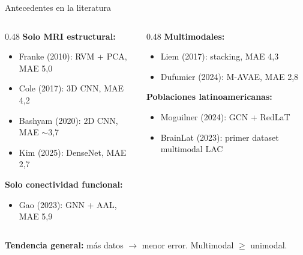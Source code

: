 \documentclass[aspectratio=169, 11pt]{beamer}
\begin{document}
\begin{frame}{Antecedentes en la literatura}
  \begin{columns}[T]
    \begin{column}{0.48\textwidth}
      \textbf{Solo MRI estructural:}
      \begin{itemize}
        \item Franke (2010): RVM + PCA, MAE 5,0
        \item Cole (2017): 3D CNN, MAE 4,2
        \item Bashyam (2020): 2D CNN, MAE $\sim$3,7
        \item Kim (2025): DenseNet, MAE 2,7
      \end{itemize}

      \vspace{0.3cm}
      \textbf{Solo conectividad funcional:}
      \begin{itemize}
        \item Gao (2023): GNN + AAL, MAE 5,9
      \end{itemize}
    \end{column}
    \begin{column}{0.48\textwidth}
      \textbf{Multimodales:}
      \begin{itemize}
        \item Liem (2017): stacking, MAE 4,3
        \item Dufumier (2024): M-AVAE, MAE 2,8
      \end{itemize}

      \vspace{0.3cm}
      \textbf{Poblaciones latinoamericanas:}
      \begin{itemize}
        \item Moguilner (2024): GCN + RedLaT
        \item BrainLat (2023): primer dataset multimodal LAC
      \end{itemize}
    \end{column}
  \end{columns}

  \vspace{0.3cm}
  \centering
  {\small \textbf{Tendencia general:} más datos $\rightarrow$ menor error. Multimodal $\geq$ unimodal.}
\end{frame}
\end{document}
